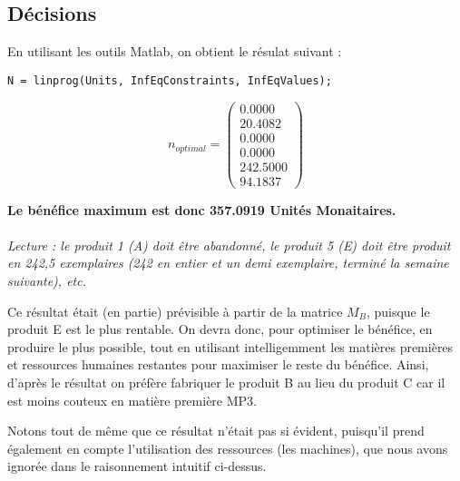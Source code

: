 \subsection{Décisions}

En utilisant les outils Matlab, on obtient le résulat suivant :
\begin{lstlisting}
N = linprog(Units, InfEqConstraints, InfEqValues);
\end{lstlisting}

\[
	n_{optimal} = 
\begin{pmatrix}
    0.0000 \\
   20.4082 \\
    0.0000 \\
    0.0000 \\
  242.5000 \\
   94.1837
\end{pmatrix}
\]

\begin{center}
\textbf{Le bénéfice maximum est donc 357.0919 Unités Monaitaires.\\}
~\\
\textit{Lecture : le produit 1 (A) doit être abandonné, le produit 5 (E) doit
être produit en 242,5 exemplaires (242 en entier et un demi exemplaire, terminé la semaine suivante), etc.}
\end{center}

Ce résultat était (en partie) prévisible à partir de la matrice $M_{B}$, puisque le produit E est le plus rentable. On devra donc, pour optimiser le bénéfice, en produire le plus possible, tout en utilisant intelligemment les matières premières et ressources humaines restantes pour maximiser le reste du bénéfice. Ainsi, d'après le résultat on préfère fabriquer le produit B au lieu du produit C car il est moins couteux en matière première MP3.

Notons tout de même que ce résultat n'était pas si évident, puisqu'il prend également en compte l'utilisation des ressources (les machines), que nous avons ignorée dans le raisonnement \og intuitif \fg ci-dessus.

